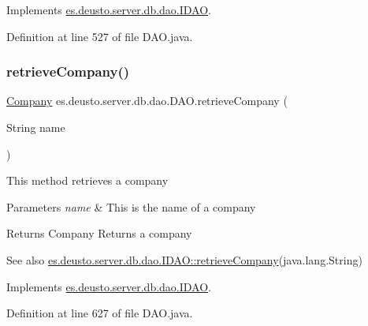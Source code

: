Implements \hyperlink{interfacees_1_1deusto_1_1server_1_1db_1_1dao_1_1_i_d_a_o_aef2783889a572e23bd57c5a2a955599a}{es.\+deusto.\+server.\+db.\+dao.\+I\+D\+AO}.



Definition at line 527 of file D\+A\+O.\+java.

\mbox{\label{classes_1_1deusto_1_1server_1_1db_1_1dao_1_1_d_a_o_aabd374b169473cfd6e1bdc4efc89b177}} 
\subsubsection{\texorpdfstring{retrieve\+Company()}{retrieveCompany()}}
{\footnotesize\ttfamily \hyperlink{classes_1_1deusto_1_1server_1_1db_1_1data_1_1_company}{Company} es.\+deusto.\+server.\+db.\+dao.\+D\+A\+O.\+retrieve\+Company (\begin{DoxyParamCaption}\item[{String}]{name }\end{DoxyParamCaption})}

This method retrieves a company 
\begin{DoxyParams}{Parameters}
{\em name} & This is the name of a company \\
\hline
\end{DoxyParams}
\begin{DoxyReturn}{Returns}
Company Returns a company 
\end{DoxyReturn}
\begin{DoxySeeAlso}{See also}
\hyperlink{interfacees_1_1deusto_1_1server_1_1db_1_1dao_1_1_i_d_a_o_ad6fd7873e2191e887184e2261e34e3e5}{es.\+deusto.\+server.\+db.\+dao.\+I\+D\+A\+O\+::retrieve\+Company}(java.\+lang.\+String) 
\end{DoxySeeAlso}


Implements \hyperlink{interfacees_1_1deusto_1_1server_1_1db_1_1dao_1_1_i_d_a_o_ad6fd7873e2191e887184e2261e34e3e5}{es.\+deusto.\+server.\+db.\+dao.\+I\+D\+AO}.



Definition at line 627 of file D\+A\+O.\+java.

\mbox{\label{classes_1_1deusto_1_1server_1_1db_1_1dao_1_1_d_a_o_ac94a91d3e5aeeb98fc12f087532b3506}} 
